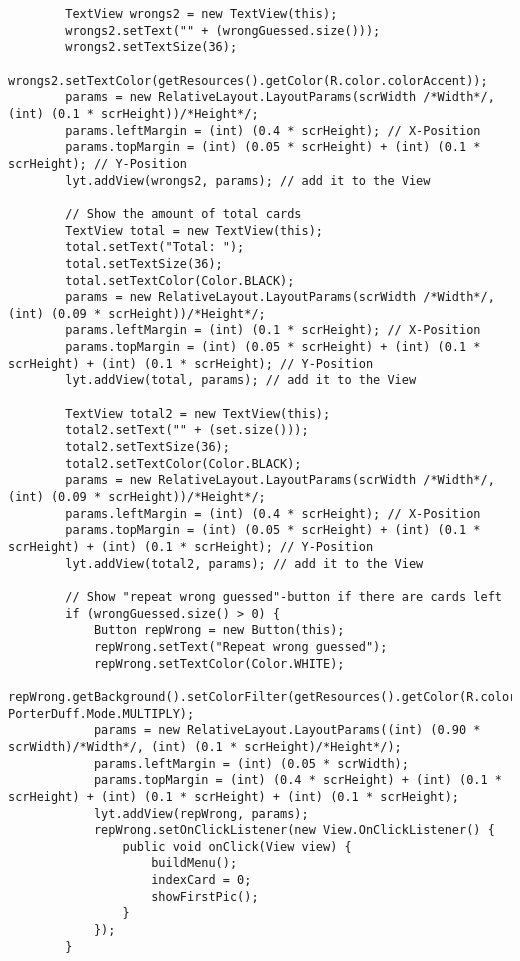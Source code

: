 \begin{lstlisting}
        TextView wrongs2 = new TextView(this);
        wrongs2.setText("" + (wrongGuessed.size()));
        wrongs2.setTextSize(36);
        wrongs2.setTextColor(getResources().getColor(R.color.colorAccent));
        params = new RelativeLayout.LayoutParams(scrWidth /*Width*/, (int) (0.1 * scrHeight))/*Height*/;
        params.leftMargin = (int) (0.4 * scrHeight); // X-Position
        params.topMargin = (int) (0.05 * scrHeight) + (int) (0.1 * scrHeight); // Y-Position
        lyt.addView(wrongs2, params); // add it to the View

        // Show the amount of total cards
        TextView total = new TextView(this);
        total.setText("Total: ");
        total.setTextSize(36);
        total.setTextColor(Color.BLACK);
        params = new RelativeLayout.LayoutParams(scrWidth /*Width*/, (int) (0.09 * scrHeight))/*Height*/;
        params.leftMargin = (int) (0.1 * scrHeight); // X-Position
        params.topMargin = (int) (0.05 * scrHeight) + (int) (0.1 * scrHeight) + (int) (0.1 * scrHeight); // Y-Position
        lyt.addView(total, params); // add it to the View

        TextView total2 = new TextView(this);
        total2.setText("" + (set.size()));
        total2.setTextSize(36);
        total2.setTextColor(Color.BLACK);
        params = new RelativeLayout.LayoutParams(scrWidth /*Width*/, (int) (0.09 * scrHeight))/*Height*/;
        params.leftMargin = (int) (0.4 * scrHeight); // X-Position
        params.topMargin = (int) (0.05 * scrHeight) + (int) (0.1 * scrHeight) + (int) (0.1 * scrHeight); // Y-Position
        lyt.addView(total2, params); // add it to the View

        // Show "repeat wrong guessed"-button if there are cards left
        if (wrongGuessed.size() > 0) {
            Button repWrong = new Button(this);
            repWrong.setText("Repeat wrong guessed");
            repWrong.setTextColor(Color.WHITE);
            repWrong.getBackground().setColorFilter(getResources().getColor(R.color.colorAccent), PorterDuff.Mode.MULTIPLY);
            params = new RelativeLayout.LayoutParams((int) (0.90 * scrWidth)/*Width*/, (int) (0.1 * scrHeight)/*Height*/);
            params.leftMargin = (int) (0.05 * scrWidth);
            params.topMargin = (int) (0.4 * scrHeight) + (int) (0.1 * scrHeight) + (int) (0.1 * scrHeight) + (int) (0.1 * scrHeight);
            lyt.addView(repWrong, params);
            repWrong.setOnClickListener(new View.OnClickListener() {
                public void onClick(View view) {
                    buildMenu();
                    indexCard = 0;
                    showFirstPic();
                }
            });
        }


\end{lstlisting}
